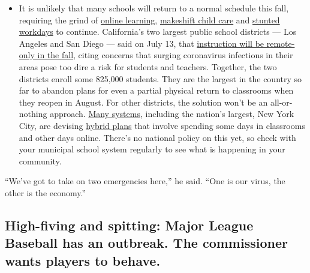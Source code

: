 \begin{itemize}
  \begin{itemize}
  \tightlist
  \item
    It is unlikely that many schools will return to a normal schedule
    this fall, requiring the grind of
    \href{https://www.nytimes.com/2020/06/05/us/coronavirus-education-lost-learning.html?action=click\&pgtype=Article\&state=default\&region=MAIN_CONTENT_3\&context=storylines_faq}{online
    learning},
    \href{https://www.nytimes.com/2020/05/29/us/coronavirus-child-care-centers.html?action=click\&pgtype=Article\&state=default\&region=MAIN_CONTENT_3\&context=storylines_faq}{makeshift
    child care} and
    \href{https://www.nytimes.com/2020/06/03/business/economy/coronavirus-working-women.html?action=click\&pgtype=Article\&state=default\&region=MAIN_CONTENT_3\&context=storylines_faq}{stunted
    workdays} to continue. California's two largest public school
    districts --- Los Angeles and San Diego --- said on July 13, that
    \href{https://www.nytimes.com/2020/07/13/us/lausd-san-diego-school-reopening.html?action=click\&pgtype=Article\&state=default\&region=MAIN_CONTENT_3\&context=storylines_faq}{instruction
    will be remote-only in the fall}, citing concerns that surging
    coronavirus infections in their areas pose too dire a risk for
    students and teachers. Together, the two districts enroll some
    825,000 students. They are the largest in the country so far to
    abandon plans for even a partial physical return to classrooms when
    they reopen in August. For other districts, the solution won't be an
    all-or-nothing approach.
    \href{https://bioethics.jhu.edu/research-and-outreach/projects/eschool-initiative/school-policy-tracker/}{Many
    systems}, including the nation's largest, New York City, are
    devising
    \href{https://www.nytimes.com/2020/06/26/us/coronavirus-schools-reopen-fall.html?action=click\&pgtype=Article\&state=default\&region=MAIN_CONTENT_3\&context=storylines_faq}{hybrid
    plans} that involve spending some days in classrooms and other days
    online. There's no national policy on this yet, so check with your
    municipal school system regularly to see what is happening in your
    community.
  \end{itemize}
\end{itemize}

``We've got to take on two emergencies here,'' he said. ``One is our
virus, the other is the economy.''

\hypertarget{high-fiving-and-spitting-major-league-baseball-has-an-outbreak-the-commissioner-wants-players-to-behave}{%
\subsection{High-fiving and spitting: Major League Baseball has an
outbreak. The commissioner wants players to
behave.}\label{high-fiving-and-spitting-major-league-baseball-has-an-outbreak-the-commissioner-wants-players-to-behave}}

